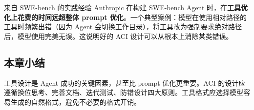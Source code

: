 \begin{knowledgebox}{来自 SWE-bench 的实践经验}
Anthropic 在构建 SWE-bench Agent 时，在\textbf{工具优化上花费的时间远超整体 prompt 优化}。一个典型案例：模型在使用相对路径的工具时频繁出错（因为 Agent 会切换工作目录），将工具改为强制要求绝对路径后，模型使用完美无误。这说明好的 ACI 设计可以从根本上消除某类错误。
\end{knowledgebox}

\subsection{本章小结}
工具设计是 Agent 成功的关键因素，甚至比 prompt 优化更重要。ACI 的设计应遵循换位思考、完善文档、迭代测试、防错设计四大原则。工具格式应选择模型容易生成的自然格式，避免不必要的格式开销。


